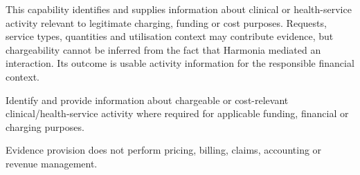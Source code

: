 This capability identifies and supplies information about clinical or health-service activity relevant to legitimate charging, funding or cost purposes. Requests, service types, quantities and utilisation context may contribute evidence, but chargeability cannot be inferred from the fact that Harmonia mediated an interaction. Its outcome is usable activity information for the responsible financial context.



Identify and provide information about chargeable or cost-relevant clinical/\allowbreak{}health-service activity where required for applicable funding, financial or charging purposes.



Evidence provision does not perform pricing, billing, claims, accounting or revenue management.


